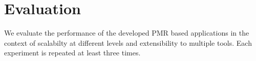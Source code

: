 \documentclass{acm_proc_article-sp}
\begin{document}
 

\section{Evaluation}\label{sec:results}
We evaluate the performance of the developed PMR based applications in the context of scalabilty at different levels and extensibility to multiple tools.
Each experiment is repeated at least three times.




 
\end{document}
